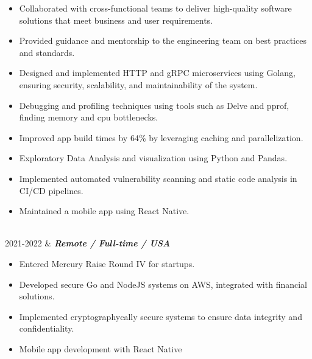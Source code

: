 \documentclass[]{cv-mauri}
\begin{document}
\begin{tabularcv}
			\begin{itemize}
				\item Collaborated with cross-functional teams to deliver high-quality software solutions that meet business and user requirements.
				\item Provided guidance and mentorship to the engineering team on best practices and standards.
				\item Designed and implemented HTTP and gRPC microservices using Golang, ensuring security, scalability, and maintainability of the system.
				\item Debugging and profiling techniques using tools such as Delve and pprof, finding memory and cpu bottlenecks.
				\item Improved app build times by 64\% by leveraging caching and parallelization.
				\item Exploratory Data Analysis and visualization using Python and Pandas.
				\item Implemented automated vulnerability scanning and static code analysis in CI/CD pipelines.
				\item Maintained a mobile app using React Native.
			\end{itemize}
					\\[\vspacepar]

	2021-2022   &   
					\textbf{\textit{Remote / Full-time / USA}}

			\begin{itemize}
				\item Entered Mercury Raise Round IV for startups.
				\item Developed secure Go and NodeJS systems on AWS, integrated with financial solutions.
				\item Implemented cryptographycally secure systems to ensure data integrity and confidentiality.
				\item Mobile app development with React Native
			\end{itemize}
					\\[\vspacepar]


\end{tabularcv}
\end{document}
